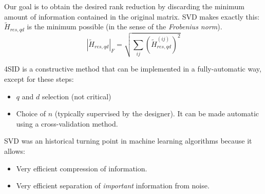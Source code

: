 Our goal is to obtain the desired rank reduction by discarding the minimum amount of information contained in the original matrix.
SVD makes exactly this: $\tilde{H}_{res,qd}$ is the minimum possible (in the sense of the \emph{Frobenius norm}).
\[
    \left|\tilde{H}_{res,qd}\right|_F = \sqrt{\sum_{ij} \left(\tilde{H}_{res,qd}^{(ij)} \right)^2}
\]

\begin{rem}
    4SID is a constructive method that can be implemented in a fully-automatic way, except for these steps:
    \begin{itemize}
        \item $q$ and $d$ selection (not critical)
        \item Choice of $n$ (typically supervised by the designer). It can be made automatic using a cross-validation method.
    \end{itemize}
\end{rem}

\begin{rem}
    SVD was an historical turning point in machine learning algorithms because it allows:
    \begin{itemize}
        \item Very efficient compression of information.
        \item Very efficient separation of \emph{important} information from noise.
    \end{itemize}
\end{rem}
